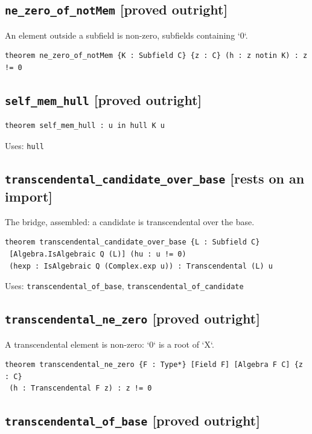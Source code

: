 \documentclass[11pt,a4paper]{article}
\newcommand{\tagon}{\textcolor{onaxc}{\textbf{[rests on an import]}}}
\newcommand{\tagpr}{\textcolor{provedc}{\textbf{[proved outright]}}}
\begin{document}
\subsection*{\texttt{ne\_zero\_of\_notMem} \hfill \tagpr}

An element outside a subfield is non-zero, subfields containing `0`.

\begin{lstlisting}
theorem ne_zero_of_notMem {K : Subfield C} {z : C} (h : z notin K) : z != 0
\end{lstlisting}

\subsection*{\texttt{self\_mem\_hull} \hfill \tagpr}
\begin{lstlisting}
theorem self_mem_hull : u in hull K u
\end{lstlisting}
\noindent\footnotesize Uses: \texttt{hull}\normalsize


\subsection*{\texttt{transcendental\_candidate\_over\_base} \hfill \tagon}

The bridge, assembled: a candidate is transcendental over the base.

\begin{lstlisting}
theorem transcendental_candidate_over_base {L : Subfield C}
 [Algebra.IsAlgebraic Q (L)] (hu : u != 0)
 (hexp : IsAlgebraic Q (Complex.exp u)) : Transcendental (L) u
\end{lstlisting}
\noindent\footnotesize Uses: \texttt{transcendental\_of\_base}, \texttt{transcendental\_of\_candidate}\normalsize


\subsection*{\texttt{transcendental\_ne\_zero} \hfill \tagpr}

A transcendental element is non-zero: `0` is a root of `X`.

\begin{lstlisting}
theorem transcendental_ne_zero {F : Type*} [Field F] [Algebra F C] {z : C}
 (h : Transcendental F z) : z != 0
\end{lstlisting}

\subsection*{\texttt{transcendental\_of\_base} \hfill \tagpr}
\end{document}
